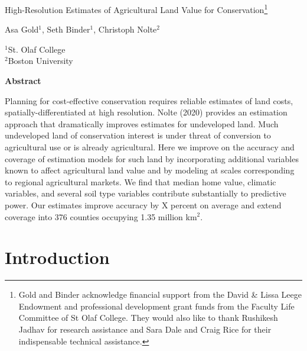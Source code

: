 \documentclass[12pt]{article}
\begin{document}
\hspace{5pt}

\Large
 \begin{center}
High-Resolution Estimates of Agricultural Land Value for Conservation\footnote[2]{Gold and Binder acknowledge financial support from the David \& Lissa Leege Endowment and professional development grant funds from the Faculty Life Committee of St Olaf College. They would also like to thank Rushikesh Jadhav for research assistance and Sara Dale and Craig Rice for their indispensable technical assistance.}\\ 

\vspace{10pt}

\large
Asa Gold$^1$, Seth Binder$^1$, Christoph Nolte$^2$ \\

\vspace{10pt}

\footnotesize  
$^{1}$St. Olaf College\\
$^2$Boston University

\vspace{40pt} 

    \normalsize
    \textbf{Abstract}
\end{center}

\small
Planning for cost-effective conservation requires reliable estimates of land costs, spatially-differentiated at high resolution. Nolte (2020) provides an estimation approach that dramatically improves estimates for undeveloped land. Much undeveloped land of conservation interest is under threat of conversion to agricultural use or is already agricultural. Here we improve on the accuracy and coverage of estimation models for such land by incorporating additional variables known to affect agricultural land value and by modeling at scales corresponding to regional agricultural markets. We find that median home value, climatic variables, and several soil type variables contribute substantially to predictive power. Our estimates improve accuracy by X percent on average and extend coverage into 376 counties occupying 1.35 million km$^2$.

\newpage

\section{Introduction}
\end{document}
